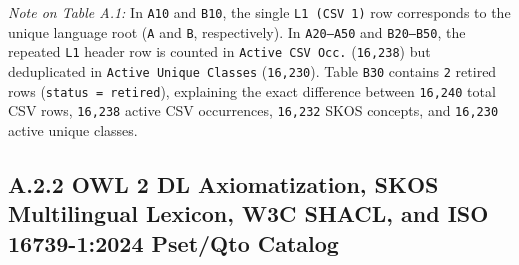 \documentclass[10pt,a4paper]{article}
\begin{document}
\textit{Note on Table A.1:} In \texttt{A10} and \texttt{B10}, the single \texttt{L1 (CSV 1)} row corresponds to the unique language root (\texttt{A} and \texttt{B}, respectively). In \texttt{A20--A50} and \texttt{B20--B50}, the repeated \texttt{L1} header row is counted in \texttt{Active CSV Occ.} (\texttt{16,238}) but deduplicated in \texttt{Active Unique Classes} (\texttt{16,230}). Table \texttt{B30} contains \texttt{2} retired rows (\texttt{status = retired}), explaining the exact difference between \texttt{16,240} total CSV rows, \texttt{16,238} active CSV occurrences, \texttt{16,232} SKOS concepts, and \texttt{16,230} active unique classes.

\subsection*{A.2.2 OWL 2 DL Axiomatization, SKOS Multilingual Lexicon, W3C SHACL, and ISO 16739-1:2024 Pset/Qto Catalog}
\end{document}
